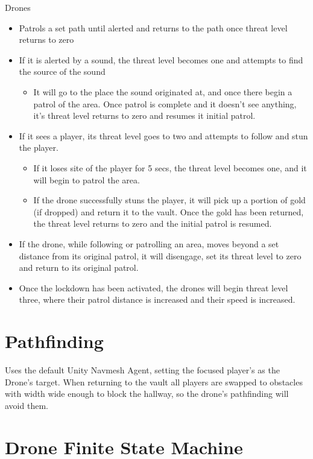 \documentclass[11pt]{report}
\begin{document}
Drones

\begin{itemize}
    \item Patrols a set path until alerted and returns to the path once threat level returns to zero
    \item If it is alerted by a sound, the threat level becomes one and attempts to find the source of the sound
    \begin{itemize}
        \item It will go to the place the sound originated at, and once there begin a patrol of the area. Once patrol is complete and it doesn’t see anything, it’s threat level returns to zero and resumes it initial patrol.
    \end{itemize}
    \item If it sees a player, its threat level goes to two and attempts to follow and stun the player.
    \begin{itemize}
        \item If it loses site of the player for 5 secs, the threat level becomes one, and it will begin to patrol the area.
        \item If the drone successfully stuns the player, it will pick up a portion of gold (if dropped) and return it to the vault. Once the gold has been returned, the threat level returns to zero and the initial patrol is resumed.
    \end{itemize}
    \item If the drone, while following or patrolling an area, moves beyond a set distance from its original patrol, it will disengage, set its threat level to zero and return to its original patrol.
    \item Once the lockdown has been activated, the drones will begin threat level three, where their patrol distance is increased and their speed is increased.    
\end{itemize}

\section{Pathfinding}

Uses the default Unity Navmesh Agent, setting the focused player’s as the Drone’s target. When returning to the vault all players are swapped to obstacles with width wide enough to block the hallway, so the drone’s pathfinding will avoid them.

\section{Drone Finite State Machine}
\end{document}
